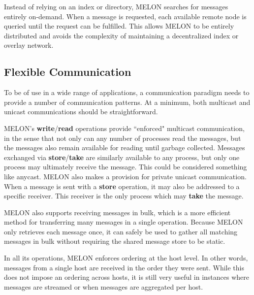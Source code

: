 Instead of relying on an index or directory, MELON searches for messages entirely on-demand. When a message is requested, each available remote node is queried until the request can be fulfilled. This allows MELON to be entirely distributed and avoids the complexity of maintaining a decentralized index or overlay network.

\subsection{Flexible Communication}

To be of use in a wide range of applications, a communication paradigm needs to provide a number of communication patterns. At a minimum, both multicast and unicast communications should be straightforward.

MELON's \textbf{write}/\textbf{read} operations provide ``enforced" multicast communication, in the sense that not only can any number of processes read the messages, but the messages also remain available for reading until garbage collected. Messages exchanged via \textbf{store}/\textbf{take} are similarly available to any process, but only one process may ultimately receive the message. This could be considered something like anycast. MELON also makes a provision for private unicast communication. When a message is sent with a \textbf{store} operation, it may also be addressed to a specific receiver. This receiver is the only process which may \textbf{take} the message.

MELON also supports receiving messages in bulk, which is a more efficient method for transferring many messages in a single operation. Because MELON only retrieves each message once, it can safely be used to gather all matching messages in bulk without requiring the shared message store to be static.

In all its operations, MELON enforces ordering at the host level. In other words, messages from a single host are received in the order they were sent. While this does not impose an ordering across hosts, it is still very useful in instances where messages are streamed or when messages are aggregated per host.